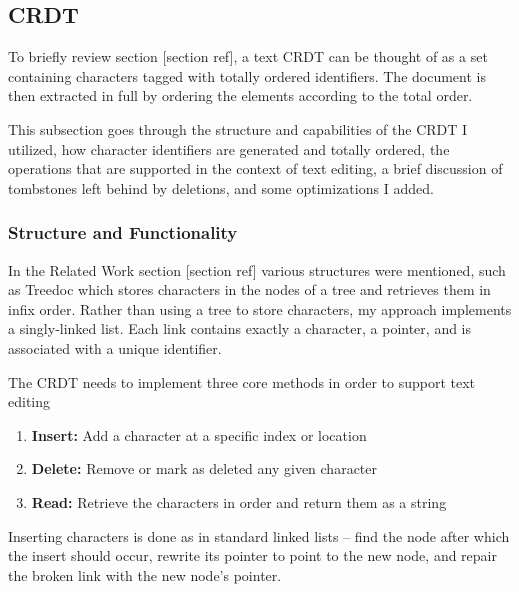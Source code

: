 \documentclass[12pt,a4paper,twoside,openright]{report}
\begin{document}
	
	\subsection{CRDT}
		To briefly review section [section ref], a text CRDT can be thought of as a set containing characters tagged with totally ordered identifiers. The document is then extracted in full by ordering the elements according to the total order. 
		
		This subsection goes through the structure and capabilities of the CRDT I utilized, how character identifiers are generated and totally ordered, the operations that are supported in the context of text editing, a brief discussion of tombstones left behind by deletions, and some optimizations I added.
		
		\subsubsection{Structure and Functionality}
		In the Related Work section [section ref] various structures were mentioned, such as Treedoc which stores characters in the nodes of a tree and retrieves them in infix order. Rather than using a tree to store characters, my approach implements a singly-linked list. Each link contains exactly a character, a pointer, and is associated with a unique identifier.
		
		The CRDT needs to implement three core methods in order to support text editing
		\begin{enumerate}
			\item \textbf{Insert:} Add a character at a specific index or location
			\item \textbf{Delete:} Remove or mark as deleted any given character
			\item \textbf{Read:} Retrieve the characters in order and return them as a string
		\end{enumerate} 
		
		Inserting characters is done as in standard linked lists -- find the node after which the insert should occur, rewrite its pointer to point to the new node, and repair the broken link with the new node's pointer.
		
\end{document}
